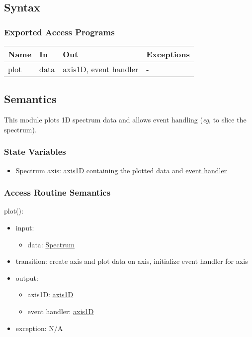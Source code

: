 \documentclass[12pt, titlepage]{article}
\begin{document}
\subsection{Syntax}

\subsubsection{Exported Access Programs}

\begin{center}
\begin{tabular}{p{2cm} p{4cm} p{4cm} p{2cm}}
\hline
\textbf{Name} & \textbf{In} & \textbf{Out} & \textbf{Exceptions} \\
\hline
plot & data & axis1D, event handler & - \\
\hline
\end{tabular}
\end{center}

\subsection{Semantics}
This module plots 1D spectrum data and allows event handling (\textit{eg}, to slice the spectrum).

\subsubsection{State Variables}
\begin{itemize}
    \item Spectrum axis: \hyperref[Mod:Plotting]{axis1D} containing the plotted data and \hyperref[Mod:Plotting]{event handler}
\end{itemize}

\subsubsection{Access Routine Semantics}

\noindent plot():
\begin{itemize}
    \item input:
    \begin{itemize}
        \item data: \hyperref[Mod:Spectrum]{Spectrum}
    \end{itemize}
    \item transition: create axis and plot data on axis, initialize event handler for axis
    \item output:
    \begin{itemize}
        \item axis1D: \hyperref[Mod:Plotting]{axis1D}
        \item event handler: \hyperref[Mod:Plotting]{axis1D}
    \end{itemize}
    \item exception: N/A
\end{itemize}
\end{document}
